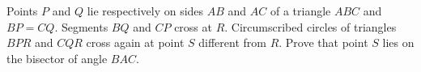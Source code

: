 Points $P$ and $Q$ lie respectively on sides $AB$ and $AC$ of a triangle $ABC$ and $BP=CQ$. Segments $BQ$ and $CP$ cross at $R$. Circumscribed circles of triangles $BPR$ and $CQR$ cross again at point $S$ different from $R$. Prove that point $S$ lies on the bisector of angle $BAC$.